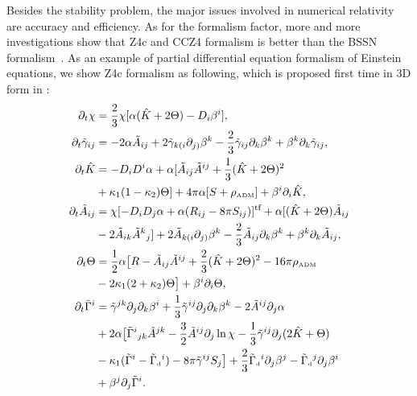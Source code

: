 \documentclass[a4paper,11pt]{article}
\begin{document}
Besides the stability problem, the major issues involved in numerical relativity are accuracy and efficiency. As for the formalism factor, more and more investigations show that Z4c and CCZ4 formalism is better than the BSSN formalism~\cite{Bernuzzi:2009ex,Cao:2011fu,Alic:2013xsa}. As an example of partial differential equation formalism of Einstein equations, we show Z4c formalism as following, which is proposed first time in 3D form in \cite{Cao:2011fu}:
\begin{align}
\partial_t\chi&=\frac{2}{3}\chi[\alpha(\hat{K}+2\Theta)-D_i\beta^{i}],\\
\partial_t\tilde\gamma_{ij}&=
- 2 \alpha \tilde A_{ij}+2\tilde\gamma_{k(i}\partial_{j)}\beta^k
- \frac{2}{3} \tilde\gamma_{ij}\partial_{k}\beta^k
+ \beta^k\partial_k\tilde{\gamma}_{ij},\\
\partial_t\hat{K}&=-D_iD^i\alpha + \alpha[\tilde{A}_{ij}\tilde{A}^{ij}
+\frac{1}{3}(\hat{K}+2\Theta)^2\nonumber\\
&+\kappa_1(1-\kappa_2)\Theta]
+4\pi\alpha[S+\rho_{\textrm{\tiny{ADM}}}]+\beta^i\partial_i\hat{K},\\
\partial_t\tilde{A}_{ij}& = \chi [-D_iD_j\alpha+\alpha(R_{ij}
-8\pi S_{ij})]^{\textrm{tf}}
+\alpha [(\hat{K}+2\Theta)\tilde A_{ij} \nonumber\\
&- 2\tilde A_{ik}\tilde A^k{}_j]+2\tilde A_{k(i}\partial_{j)}\beta^k
-\frac{2}{3}\tilde A_{ij}\partial_k\beta^k
+ \beta^k\partial_k\tilde A_{ij},\\
\partial_t\Theta&=\frac{1}{2}\alpha\big[R-\tilde{A}_{ij}\tilde{A}^{ij}
+\frac{2}{3}(\hat{K}+2\Theta)^2-16\pi\rho_{\textrm{\tiny{ADM}}}\nonumber\\
&-2\kappa_1(2+\kappa_2)\Theta\big]+\beta^i\partial_i\Theta,\\
\partial_t\tilde{\Gamma}^i&= \tilde{\gamma}^{jk}\partial_j\partial_k\beta^i
+\frac{1}{3}\tilde{\gamma}^{ij}\partial_j\partial_k\beta^k
-2\tilde{A}^{ij}\partial_j\alpha\nonumber\\
&+2\alpha \big[\tilde{\Gamma}^i{}_{jk}\tilde A^{jk}
-\frac{3}{2}\tilde{A}^{ij}\partial_j\ln\chi
-\frac{1}{3}\tilde{\gamma}^{ij}\partial_j(2\hat{K}+\Theta)\nonumber\\
&-\kappa_1(\tilde{\Gamma}^i-\tilde{\Gamma}_{\textrm{\tiny{d}}}{}^i)
-8\pi\tilde{\gamma}^{ij}S_j
\big]+\frac{2}{3}\tilde{\Gamma}_{\textrm{\tiny{d}}}{}^i\partial_j\beta^j
-\tilde{\Gamma}_{\textrm{\tiny{d}}}{}^j\partial_j\beta^i\nonumber\\
&+\beta^j\partial_j\tilde{\Gamma}^i.
\end{align}
\end{document}
